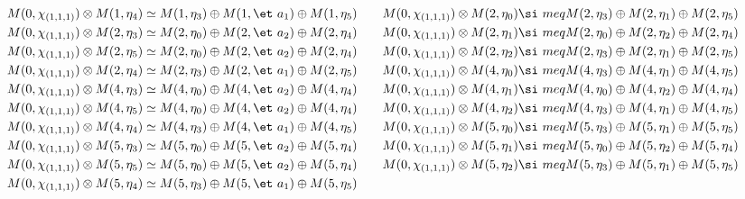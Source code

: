 \begin{align*}
M(0,\chi_{(1,1,1)}) &\otimes M(1,\eta_{4}) \simeq M(1,\eta_{3}) \oplus M(1,\et\
a_{1}) \oplus M(1,\eta_{5}) &&& M(0,\chi_{(1,1,1)}) &\otimes M(2,\eta_{0}) \si\
meq M(2,\eta_{3}) \oplus M(2,\eta_{1}) \oplus M(2,\eta_{5})\\
M(0,\chi_{(1,1,1)}) &\otimes M(2,\eta_{3}) \simeq M(2,\eta_{0}) \oplus M(2,\et\
a_{2}) \oplus M(2,\eta_{4}) &&& M(0,\chi_{(1,1,1)}) &\otimes M(2,\eta_{1}) \si\
meq M(2,\eta_{0}) \oplus M(2,\eta_{2}) \oplus M(2,\eta_{4})\\
M(0,\chi_{(1,1,1)}) &\otimes M(2,\eta_{5}) \simeq M(2,\eta_{0}) \oplus M(2,\et\
a_{2}) \oplus M(2,\eta_{4}) &&& M(0,\chi_{(1,1,1)}) &\otimes M(2,\eta_{2}) \si\
meq M(2,\eta_{3}) \oplus M(2,\eta_{1}) \oplus M(2,\eta_{5})\\
M(0,\chi_{(1,1,1)}) &\otimes M(2,\eta_{4}) \simeq M(2,\eta_{3}) \oplus M(2,\et\
a_{1}) \oplus M(2,\eta_{5}) &&& M(0,\chi_{(1,1,1)}) &\otimes M(4,\eta_{0}) \si\
meq M(4,\eta_{3}) \oplus M(4,\eta_{1}) \oplus M(4,\eta_{5})\\
M(0,\chi_{(1,1,1)}) &\otimes M(4,\eta_{3}) \simeq M(4,\eta_{0}) \oplus M(4,\et\
a_{2}) \oplus M(4,\eta_{4}) &&& M(0,\chi_{(1,1,1)}) &\otimes M(4,\eta_{1}) \si\
meq M(4,\eta_{0}) \oplus M(4,\eta_{2}) \oplus M(4,\eta_{4})\\
M(0,\chi_{(1,1,1)}) &\otimes M(4,\eta_{5}) \simeq M(4,\eta_{0}) \oplus M(4,\et\
a_{2}) \oplus M(4,\eta_{4}) &&& M(0,\chi_{(1,1,1)}) &\otimes M(4,\eta_{2}) \si\
meq M(4,\eta_{3}) \oplus M(4,\eta_{1}) \oplus M(4,\eta_{5})\\
M(0,\chi_{(1,1,1)}) &\otimes M(4,\eta_{4}) \simeq M(4,\eta_{3}) \oplus M(4,\et\
a_{1}) \oplus M(4,\eta_{5}) &&& M(0,\chi_{(1,1,1)}) &\otimes M(5,\eta_{0}) \si\
meq M(5,\eta_{3}) \oplus M(5,\eta_{1}) \oplus M(5,\eta_{5})\\
M(0,\chi_{(1,1,1)}) &\otimes M(5,\eta_{3}) \simeq M(5,\eta_{0}) \oplus M(5,\et\
a_{2}) \oplus M(5,\eta_{4}) &&& M(0,\chi_{(1,1,1)}) &\otimes M(5,\eta_{1}) \si\
meq M(5,\eta_{0}) \oplus M(5,\eta_{2}) \oplus M(5,\eta_{4})\\
M(0,\chi_{(1,1,1)}) &\otimes M(5,\eta_{5}) \simeq M(5,\eta_{0}) \oplus M(5,\et\
a_{2}) \oplus M(5,\eta_{4}) &&& M(0,\chi_{(1,1,1)}) &\otimes M(5,\eta_{2}) \si\
meq M(5,\eta_{3}) \oplus M(5,\eta_{1}) \oplus M(5,\eta_{5})\\
M(0,\chi_{(1,1,1)}) &\otimes M(5,\eta_{4}) \simeq M(5,\eta_{3}) \oplus M(5,\et\
a_{1}) \oplus M(5,\eta_{5})\\
\end{align*}

